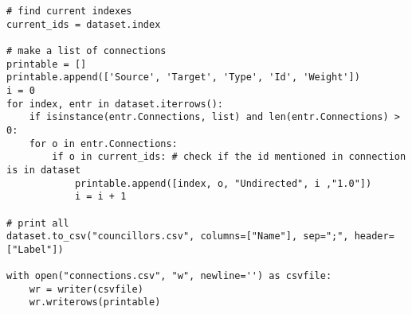 \begin{small}
\begin{verbatim}
# find current indexes
current_ids = dataset.index

# make a list of connections
printable = []
printable.append(['Source', 'Target', 'Type', 'Id', 'Weight'])
i = 0
for index, entr in dataset.iterrows():
    if isinstance(entr.Connections, list) and len(entr.Connections) > 0:
    for o in entr.Connections:
        if o in current_ids: # check if the id mentioned in connection is in dataset
            printable.append([index, o, "Undirected", i ,"1.0"])
            i = i + 1

# print all
dataset.to_csv("councillors.csv", columns=["Name"], sep=";", header=["Label"])

with open("connections.csv", "w", newline='') as csvfile:
    wr = writer(csvfile)
    wr.writerows(printable)
\end{verbatim}
\end{small}